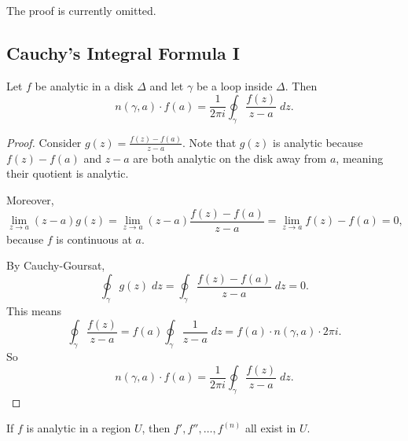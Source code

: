 \documentclass[notes]{subfile}
\begin{document}
The proof is currently omitted.

\subsection{Cauchy's Integral Formula I}
\begin{theorem}
    Let $f$ be analytic in a disk $\Delta$ and let $\gamma$ be a loop inside $\Delta$.
    Then
    \[ n(\gamma, a) \cdot f(a) = \frac{1}{2\pi i} \oint_{\gamma} 
    \frac{f(z)}{z-a} \; dz. \]
\end{theorem}

\begin{proof}
    Consider $g(z) = \frac{f(z) - f(a)}{z - a}$.
    Note that $g(z)$ is analytic because $f(z) - f(a)$ and $z-a$ are both analytic on the disk away from $a$, meaning their quotient is analytic.

    Moreover,
    \[ \lim_{z \to a} (z-a) g(z) = \lim_{z \to a} (z-a) \frac{f(z) - f(a)}{z - a} = \lim_{z \to a} f(z) - f(a) = 0, \]
    because $f$ is continuous at $a$.

    By Cauchy-Goursat,
    \[ \oint_{\gamma} g(z) \; dz = \oint_{\gamma} \frac{f(z) - f(a)}{z - a} \; dz = 0. \]
    This means
    \[ \oint_{\gamma} \frac{f(z)}{z - a} = f(a) \oint_{\gamma} \frac{1}{z-a} \; dz = f(a) \cdot n(\gamma, a) \cdot 2\pi i. \]
    So
    \[ n(\gamma, a) \cdot f(a) = \frac{1}{2\pi i} \oint_{\gamma} 
    \frac{f(z)}{z-a} \; dz. \]
\end{proof}

\begin{cor}
    If $f$ is analytic in a region $U$, then
    $f', f'', \ldots, f^{(n)}$ all exist in $U$.
\end{cor}
\end{document}
